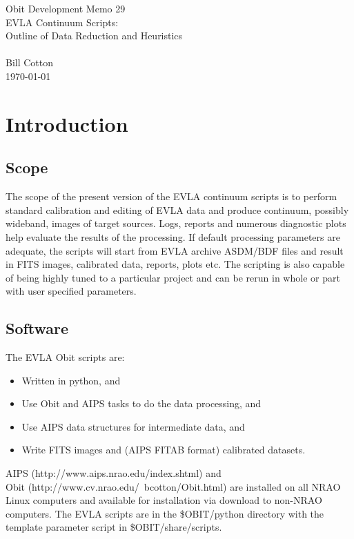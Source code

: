 \documentclass[11pt]{article}
\begin{document}
{
\begin{center}
{\Large Obit Development Memo 29\\ }
{\Large EVLA Continuum Scripts: \\
Outline of Data Reduction and Heuristics} \\
~ \\
Bill Cotton \\
\today
\end{center}}

\section{Introduction}



\subsection{Scope}

The scope of the present version of the EVLA continuum scripts is to
perform standard calibration and editing of EVLA data and produce
continuum, possibly wideband, images of target sources.
Logs, reports and numerous diagnostic plots help evaluate the results
of the processing.
If default processing parameters are adequate, the scripts will start
from EVLA archive ASDM/BDF files and result in FITS images,
calibrated data, reports, plots etc.
The scripting is also capable of being highly tuned to a particular
project and can be rerun in whole or part with user specified
parameters.

\subsection{Software}

The EVLA Obit scripts are:

\begin{itemize}
\item Written in python, and
\item Use Obit and AIPS tasks to do the data processing, and
\item Use AIPS data structures for intermediate data, and
\item Write FITS images and (AIPS FITAB format) calibrated datasets.
\end{itemize}

AIPS (http://www.aips.nrao.edu/index.shtml) and\\
Obit (http://www.cv.nrao.edu/~bcotton/Obit.html)
are installed on all NRAO Linux computers and available for 
installation via download to non-NRAO computers.
The EVLA scripts are in the \$OBIT/python directory with the template
parameter script in \$OBIT/share/scripts.
\end{document}
